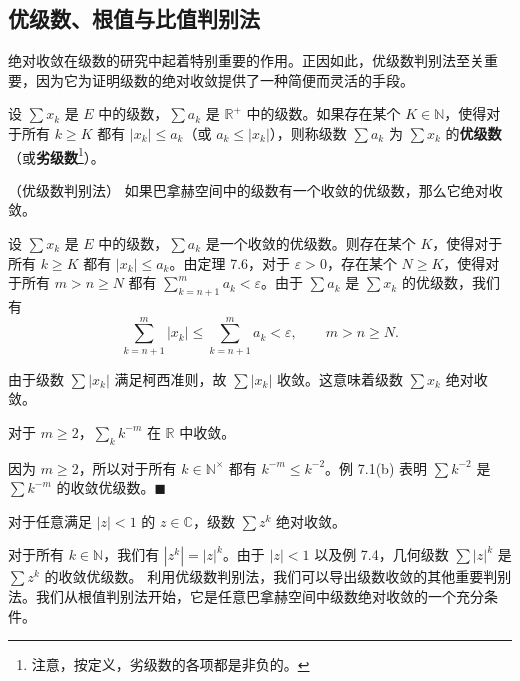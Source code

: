 \subsection*{优级数、根值与比值判别法}

绝对收敛在级数的研究中起着特别重要的作用。正因如此，优级数判别法至关重要，因为它为证明级数的绝对收敛提供了一种简便而灵活的手段。

设 $ \sum x_k $ 是 $ E $ 中的级数，$ \sum a_k $ 是 $ \mathbb{R}^+ $ 中的级数。如果存在某个 $ K \in \mathbb{N} $，使得对于所有 $ k \geq K $ 都有 $ |x_k| \leq a_k $（或 $ a_k \leq |x_k| $），则称级数 $ \sum a_k $ 为 $ \sum x_k $ 的\textbf{优级数}（或\textbf{劣级数}\footnote{注意，按定义，劣级数的各项都是非负的。}）。

\begin{theorem}

（优级数判别法） 如果巴拿赫空间中的级数有一个收敛的优级数，那么它绝对收敛。

\proofhead
设 $ \sum x_k $ 是 $ E $ 中的级数，$ \sum a_k $ 是一个收敛的优级数。则存在某个 $ K $，使得对于所有 $ k \geq K $ 都有 $ |x_k| \leq a_k $。由定理 7.6，对于 $ \varepsilon > 0 $，存在某个 $ N \geq K $，使得对于所有 $ m > n \geq N $ 都有 $ \sum_{k=n+1}^m a_k < \varepsilon $。由于 $ \sum a_k $ 是 $ \sum x_k $ 的优级数，我们有
\[
\sum_{k=n+1}^{m}\left|x_{k}\right|\leq\sum_{k=n+1}^{m}a_{k}<\varepsilon,\qquad m>n\geq N.
\]

由于级数 $ \sum|x_k| $ 满足柯西准则，故 $ \sum|x_k| $ 收敛。这意味着级数 $ \sum x_k $ 绝对收敛。

\end{theorem}

\begin{example}

\begin{items}
\item

对于 $ m \geq 2 $，$ \sum_{k} k^{-m} $ 在 $ \mathbb{R} $ 中收敛。

\proofhead
因为 $ m \geq 2 $，所以对于所有 $ k \in \mathbb{N}^\times $ 都有 $ k^{-m} \leq k^{-2} $。例 7.1(b) 表明 $ \sum k^{-2} $ 是 $ \sum k^{-m} $ 的收敛优级数。$ \blacksquare $
\item

对于任意满足 $ |z| < 1 $ 的 $ z \in \mathbb{C} $，级数 $ \sum z^k $ 绝对收敛。

\proofhead
对于所有 $ k \in \mathbb{N} $，我们有 $ |z^k| = |z|^k $。由于 $ |z| < 1 $ 以及例 7.4，几何级数 $ \sum |z|^k $ 是 $ \sum z^k $ 的收敛优级数。
利用优级数判别法，我们可以导出级数收敛的其他重要判别法。我们从根值判别法开始，它是任意巴拿赫空间中级数绝对收敛的一个充分条件。
\end{items}

\end{example}

